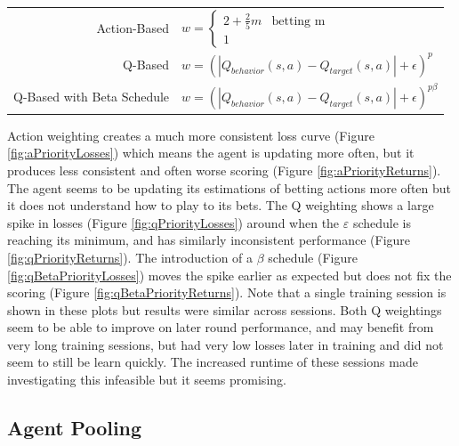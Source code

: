 \documentclass[10pt]{article} %
\begin{document}
\begin{table}[h!]
\centering
\begin{tabular}{r|l}
Action-Based & $w = \begin{cases}
2 + \frac{2}{5}m & \text{betting m} \\
1
\end{cases}$ \\
Q-Based & $w = \left( \left|Q_{behavior}(s,a) - Q_{target}(s,a)\right| + \epsilon \right)^p $ \\
Q-Based with Beta Schedule & $w = \left( \left|Q_{behavior}(s,a) - Q_{target}(s,a)\right| + \epsilon \right)^{p\beta}$
\end{tabular}
\end{table}

Action weighting creates a much more consistent loss curve (Figure \ref{fig:aPriorityLosses}) which means the agent is updating more often, but it produces less consistent and often worse scoring (Figure \ref{fig:aPriorityReturns}). The agent seems to be updating its estimations of betting actions more often but it does not understand how to play to its bets. The Q weighting shows a large spike in losses (Figure \ref{fig:qPriorityLosses}) around when the $\varepsilon$ schedule is reaching its minimum, and has similarly inconsistent performance (Figure \ref{fig:qPriorityReturns}). The introduction of a $\beta$ schedule (Figure \ref{fig:qBetaPriorityLosses}) moves the spike earlier as expected but does not fix the scoring (Figure \ref{fig:qBetaPriorityReturns}). Note that a single training session is shown in these plots but results were similar across sessions. Both Q weightings seem to be able to improve on later round performance, and may benefit from very long training sessions, but had very low losses later in training and did not seem to still be learn quickly. The increased runtime of these sessions made investigating this infeasible but it seems promising.


\newpage

\subsection{Agent Pooling}
\end{document}
